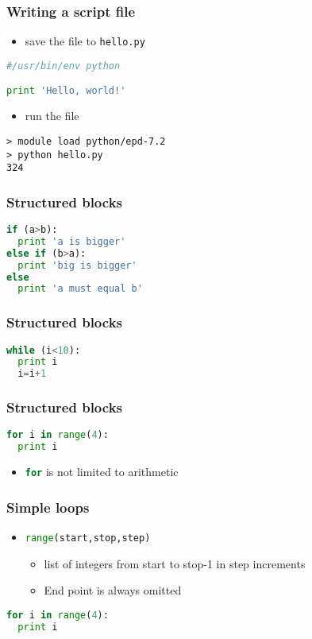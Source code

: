 \documentclass[xcolor=table,10pt,final]{beamer}
\begin{document}
\begin{frame}[fragile]
  \frametitle{Writing a script file}
  \begin{itemize}
    \item save the file to {\tt hello.py}
  \end{itemize}
\begin{lstlisting}[language=Python]
#/usr/bin/env python

print 'Hello, world!'
\end{lstlisting}
\begin{itemize}
  \item run the file
\end{itemize}
\begin{verbatim}
> module load python/epd-7.2
> python hello.py
324
\end{verbatim}
\end{frame}

\begin{frame}[fragile]
  \frametitle{Structured blocks}
  \begin{lstlisting}[language=Python]
if (a>b):
  print 'a is bigger'
else if (b>a):
  print 'big is bigger'
else
  print 'a must equal b'
\end{lstlisting}
\end{frame}

\begin{frame}[fragile]
  \frametitle{Structured blocks}
  \begin{lstlisting}[language=Python]
while (i<10):
  print i
  i=i+1
\end{lstlisting}
\end{frame}

\begin{frame}[fragile]
  \frametitle{Structured blocks}
  \begin{lstlisting}[language=Python]
for i in range(4):
  print i
\end{lstlisting}
\begin{itemize}
  \item \lstinline[language=Python]|for| is not limited to arithmetic
\end{itemize}
\end{frame}

\begin{frame}[fragile]
  \frametitle{Simple loops}
  \begin{itemize}
    \item \lstinline[language=Python]|range(start,stop,step)|
      \begin{itemize}
        \item list of integers from start to stop-1 in step increments
        \item End point is always omitted
      \end{itemize}
  \end{itemize}
\begin{lstlisting}[language=Python]
for i in range(4):
  print i
\end{lstlisting}
\end{frame}
\end{document}
